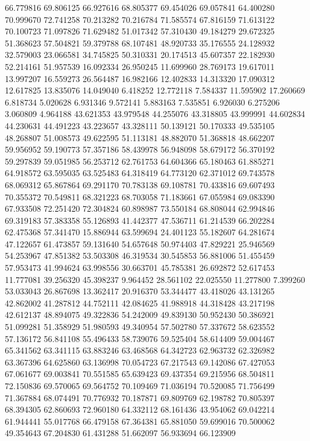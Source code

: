 66.779816
69.806125
66.927616
68.805377
69.454026
69.057841
64.400280
70.999670
72.741258
70.213282
70.216784
71.585574
67.816159
71.613122
70.100723
71.097826
71.629482
51.017342
57.310430
49.184279
29.672325
51.368623
57.504821
59.379788
68.107481
48.920733
35.176555
24.128932
32.579003
23.066581
34.745825
50.310331
20.174513
45.607357
22.182930
52.214161
51.957539
16.092334
26.950245
11.699960
28.769173
19.617011
13.997207
16.559273
26.564487
16.982166
12.402833
14.313320
17.090312
12.617825
13.835076
14.049040
6.418252
12.772118
7.584337
11.595902
17.260669
6.818734
5.020628
6.931346
9.572141
5.883163
7.535851
6.926030
6.275206
3.060809
4.964188
43.621353
43.979548
44.255076
43.318805
43.999991
44.602834
44.230631
44.491223
43.223657
43.328111
50.139121
50.170333
49.535105
48.268807
51.008573
49.622595
51.113181
48.882070
51.368818
48.662207
59.956952
59.190773
57.357186
58.439978
56.948098
58.679172
56.370192
59.297839
59.051985
56.253712
62.761753
64.604366
65.180463
61.885271
64.918572
63.595035
63.525483
64.318419
64.773120
62.371012
69.743578
68.069312
65.867864
69.291170
70.783138
69.108781
70.433816
69.607493
70.355372
70.549811
68.321223
68.703058
71.183661
67.055984
69.083390
67.933508
72.251420
72.304824
60.898987
73.550184
68.808044
62.994846
69.319183
57.383358
55.126893
41.442377
47.536711
61.214539
66.202284
62.475368
57.341470
15.886944
63.599694
24.401123
55.182607
64.281674
47.122657
61.473857
59.131640
54.657648
50.974403
47.829221
25.946569
54.253967
47.851382
53.503308
46.319534
30.545853
56.881006
51.455459
57.953473
41.994624
63.998556
30.663701
45.785381
26.692872
52.617453
11.777081
39.256320
45.398237
9.964452
28.561102
22.025550
11.277800
7.399260
53.033043
26.867698
13.362417
20.916370
53.344477
43.418026
43.131265
42.862002
41.287812
44.752111
42.084625
41.988918
44.318428
43.217198
42.612137
48.894075
49.322836
54.242009
49.839130
50.952430
50.386921
51.099281
51.358929
51.980593
49.340954
57.502780
57.337672
58.623552
57.136172
56.841108
55.496433
58.739076
59.525404
58.614409
59.004467
65.341562
63.341115
63.883246
63.468568
64.342723
62.963732
62.326982
63.367396
64.625860
63.136998
70.054723
67.217543
69.142086
67.427053
67.061677
69.003841
70.551585
65.639423
69.437354
69.215956
68.504811
72.150836
69.570065
69.564752
70.109469
71.036194
70.520085
71.756499
71.367884
68.074491
70.776932
70.187871
69.809769
62.198782
70.805397
68.394305
62.860693
72.960180
64.332112
68.161436
43.954062
69.042214
61.944441
55.017768
66.479158
67.364381
65.881050
59.699016
70.500062
49.354643
67.204830
61.431288
51.662097
56.933694
66.123909
